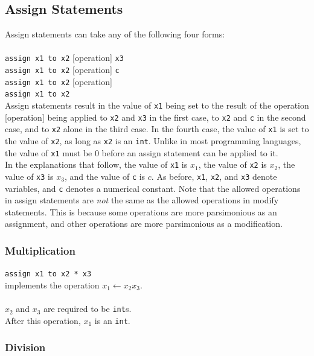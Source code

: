 \documentclass{report}
\begin{document}
\subsection{Assign Statements}

Assign statements can take any of the following four forms: \\ \\
\texttt{assign x1 to x2} [operation] \texttt{x3} \\ 
\texttt{assign x1 to x2} [operation] \texttt{c} \\
\texttt{assign x1 to x2} [operation] \\
\texttt{assign x1 to x2} \\

Assign statements result in the value of \texttt{x1} being set to the result of the operation [operation] being applied to \texttt{x2} and \texttt{x3} in the first case, to \texttt{x2} and \texttt{c} in the second case, and to \texttt{x2} alone in the third case. In the fourth case, the value of \texttt{x1} is set to the value of \texttt{x2}, as long as \texttt{x2} is an \texttt{int}. Unlike in most programming languages, the value of \texttt{x1} must be 0 before an assign statement can be applied to it. \\

In the explanations that follow, the value of \texttt{x1} is $x_1$, the value of \texttt{x2} is $x_2$, the value of \texttt{x3} is $x_3$, and the value of \texttt{c} is $c$. As before, \texttt{x1}, \texttt{x2}, and \texttt{x3} denote variables, and \texttt{c} denotes a numerical constant. Note that the allowed operations in assign statements are \emph{not} the same as the allowed operations in modify statements. This is because some operations are more parsimonious as an assignment, and other operations are more parsimonious as a modification.

\subsubsection{Multiplication}

\texttt{assign x1 to x2 * x3} \\
implements the operation $x_1 \leftarrow x_2 x_3$. \\ \\
$x_2$ and $x_3$ are required to be \texttt{int}s. \\
After this operation, $x_1$ is an \texttt{int}.

\subsubsection{Division} 
\end{document}
